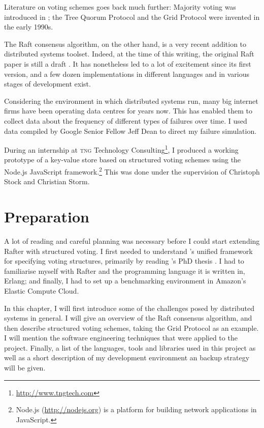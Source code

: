 \documentclass[12pt,chapterprefix=true,toc=bibliography,numbers=noendperiod,
               footnotes=multiple,twoside]{scrreprt}
\begin{document}
Literature on voting schemes goes back much further: Majority voting \autocite{majority} was introduced in ; the Tree Quorum Protocol \autocites{tree}{gen-tree} and the Grid Protocol \autocites{grid}{bettergrid} were invented in the early 1990s.

The Raft consensus algorithm, on the other hand, is a very recent addition to distributed systems toolset. Indeed, at the time of this writing, the original Raft paper is still a draft \autocite{raft}. It has nonetheless led to a lot of excitement since its first version, and a few dozen implementations in different languages and in various stages of development exist.

Considering the environment in which distributed systems run, many big internet firms have been operating data centres for years now. This has enabled them to collect data about the frequency of different types of failures over time. I used data compiled by Google Senior Fellow Jeff Dean to direct my failure simulation. \autocite{distr}

During an internship at \textsc{tng} Technology Consulting\footnote{\url{http://www.tngtech.com}}, I produced a working prototype of a key-value store based on structured voting schemes using the Node.js JavaScript framework.\footnote{Node.js (\url{http://nodejs.org}) is a platform for building network applications in JavaScript.} This was done under the supervision of Christoph Stock and Christian Storm.



\chapter{Preparation}
\label{ch:preparation}

A lot of reading and careful planning was necessary before I could start extending Rafter with structured voting. I first needed to understand \citeauthor{generators}'s unified framework for specifying voting structures, primarily by reading \citeauthor{voting}'s PhD thesis \autocite{voting}. I had to familiarise myself with Rafter and the programming language it is written in, Erlang; and finally, I had to set up a benchmarking environment in Amazon's Elastic Compute Cloud.

In this chapter, I will first introduce some of the challenges posed by distributed systems in general. I will give an overview of the Raft consensus algorithm, and then describe structured voting schemes, taking the Grid Protocol as an example. I will mention the software engineering techniques that were applied to the project. Finally, a list of the languages, tools and libraries used in this project as well as a short description of my development environment an backup strategy will be given.
\end{document}
